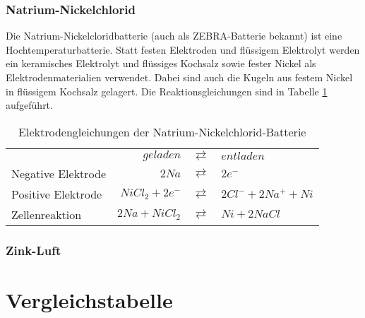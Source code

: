 \subsubsection{Natrium-Nickelchlorid}
Die Natrium-Nickelcloridbatterie (auch als ZEBRA-Batterie bekannt) ist eine Hochtemperaturbatterie. Statt festen Elektroden und flüssigem Elektrolyt werden ein keramisches Elektrolyt und flüssiges Kochsalz sowie fester Nickel als Elektrodenmaterialien verwendet. Dabei sind auch die Kugeln aus festem Nickel in flüssigem Kochsalz gelagert. Die Reaktionsgleichungen sind in Tabelle \ref{ZEBRA} aufgeführt.
\begin{table}\centering
  \begin{tabularx}{\linewidth}{XrcX}
  	                   &              $geladen$ & $\rightleftarrows$ & $entladen$        \\
  	Negative Elektrode &          $2Na$ & $\rightleftarrows$ & $2e^-$  \\
  	Positive Elektrode &   $NiCl_2 + 2e^-$ & $\rightleftarrows$ & $2Cl^- + 2Na^+ + Ni$ \\ \midrule
  	Zellenreaktion     & $2Na + NiCl_2$ & $\rightleftarrows$ & $Ni + 2NaCl$    \\
  \end{tabularx}
  \caption{Elektrodengleichungen der Natrium-Nickelchlorid-Batterie}
  \label{ZEBRA}
\end{table}

\subsubsection{Zink-Luft}
\section{Vergleichstabelle}   %
